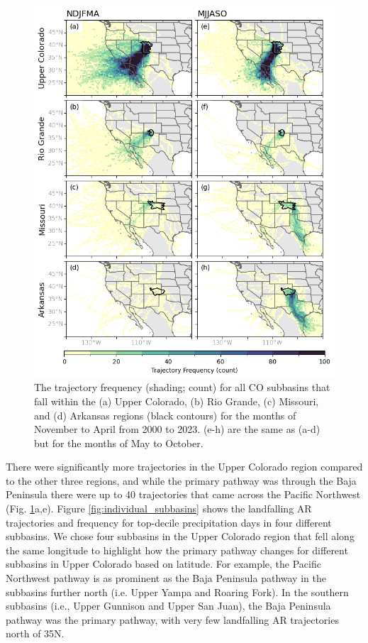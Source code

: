 \documentclass[draft]{agujournal2019}
\begin{document}
\begin{figure}
\noindent\includegraphics[width=\textwidth, height=\textheight, keepaspectratio]{fig5.png}
\caption{The trajectory frequency (shading; count) for all CO subbasins that fall within the (a) Upper Colorado, (b) Rio Grande, (c) Missouri, and (d) Arkansas regions (black contours) for the months of November to April from 2000 to 2023. (e-h) are the same as (a-d) but for the months of May to October.}
\label{fig:heatmaps}
\end{figure}

There were significantly more trajectories in the Upper Colorado region compared to the other three regions, and while the primary pathway was through the Baja Peninsula there were up to 40 trajectories that came across the Pacific Northwest (Fig. \ref{fig:heatmaps}a,e). Figure \ref{fig:individual_subbasins} shows the landfalling AR trajectories and frequency for top-decile precipitation days in four different subbasins. We chose four subbasins in the Upper Colorado region that fell along the same longitude to highlight how the primary pathway changes for different subbasins in Upper Colorado based on latitude. For example, the Pacific Northwest pathway is as prominent as the Baja Peninsula pathway in the subbasins further north (i.e. Upper Yampa and Roaring Fork). In the southern subbasins (i.e., Upper Gunnison and Upper San Juan), the Baja Peninsula pathway was the primary pathway, with very few landfalling AR trajectories north of 35\textdegree N. 
\end{document}
